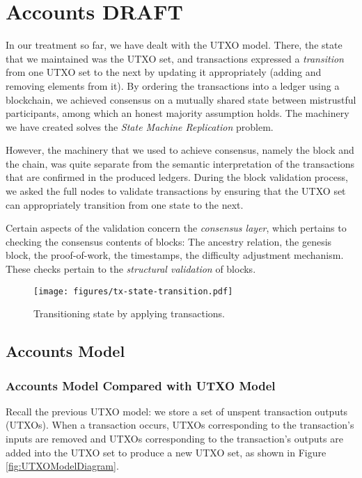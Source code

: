 \chapter{Accounts \small{\textsf{DRAFT}}}\label{chapter:accounts}

In our treatment so far, we have dealt with the UTXO model. There, the state
that we maintained was the UTXO set, and transactions expressed a \emph{transition}
from one UTXO set to the next by updating it appropriately (adding and removing elements from
it). By ordering the transactions into a ledger using a blockchain, we achieved
consensus on a mutually shared state between mistrustful participants, among
which an honest majority assumption holds. The machinery
we have created solves the \emph{State Machine Replication}
problem.

However, the machinery that we used to achieve consensus, namely the block and the chain,
was quite separate from the semantic interpretation of the transactions that are confirmed
in the produced ledgers. During the block validation process, we asked the full nodes
to validate transactions by ensuring that the UTXO set can appropriately transition
from one state to the next.

Certain aspects of the validation concern the \emph{consensus layer},
which pertains to checking the consensus contents of blocks: The ancestry relation,
the genesis block, the proof-of-work, the timestamps, the difficulty adjustment mechanism.
These checks pertain to the \emph{structural validation} of blocks. 

\begin{figure}[h]
  \centering
  \texttt{[image: figures/tx-state-transition.pdf]}
  \caption{Transitioning state by applying transactions.}
  \label{fig.state-transition}
\end{figure}

\section{Accounts Model}

\subsection{Accounts Model Compared with UTXO Model}
Recall the previous UTXO model: we store a set of unspent transaction outputs (UTXOs). When a transaction occurs, UTXOs corresponding to the transaction's inputs are removed and UTXOs corresponding to the transaction's outputs are added into the UTXO set to produce a new UTXO set, as shown in Figure \ref{fig:UTXOModelDiagram}.

